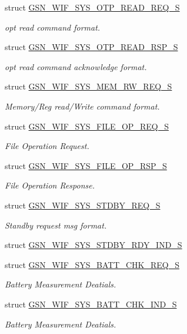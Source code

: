 \begin{DoxyCompactItemize}
struct \hyperlink{a00358}{GSN\_\-WIF\_\-SYS\_\-OTP\_\-READ\_\-REQ\_\-S}
\begin{DoxyCompactList}\small\item\em opt read command format. \end{DoxyCompactList}\item 
struct \hyperlink{a00359}{GSN\_\-WIF\_\-SYS\_\-OTP\_\-READ\_\-RSP\_\-S}
\begin{DoxyCompactList}\small\item\em opt read command acknowledge format. \end{DoxyCompactList}\item 
struct \hyperlink{a00357}{GSN\_\-WIF\_\-SYS\_\-MEM\_\-RW\_\-REQ\_\-S}
\begin{DoxyCompactList}\small\item\em Memory/Reg read/Write command format. \end{DoxyCompactList}\item 
struct \hyperlink{a00350}{GSN\_\-WIF\_\-SYS\_\-FILE\_\-OP\_\-REQ\_\-S}
\begin{DoxyCompactList}\small\item\em File Operation Request. \end{DoxyCompactList}\item 
struct \hyperlink{a00351}{GSN\_\-WIF\_\-SYS\_\-FILE\_\-OP\_\-RSP\_\-S}
\begin{DoxyCompactList}\small\item\em File Operation Response. \end{DoxyCompactList}\item 
struct \hyperlink{a00364}{GSN\_\-WIF\_\-SYS\_\-STDBY\_\-REQ\_\-S}
\begin{DoxyCompactList}\small\item\em Standby request msg format. \end{DoxyCompactList}\item 
struct \hyperlink{a00363}{GSN\_\-WIF\_\-SYS\_\-STDBY\_\-RDY\_\-IND\_\-S}
\item 
struct \hyperlink{a00346}{GSN\_\-WIF\_\-SYS\_\-BATT\_\-CHK\_\-REQ\_\-S}
\begin{DoxyCompactList}\small\item\em Battery Measurement Deatials. \end{DoxyCompactList}\item 
struct \hyperlink{a00345}{GSN\_\-WIF\_\-SYS\_\-BATT\_\-CHK\_\-IND\_\-S}
\begin{DoxyCompactList}\small\item\em Battery Measurement Deatials. \end{DoxyCompactList}\end{DoxyCompactItemize}
